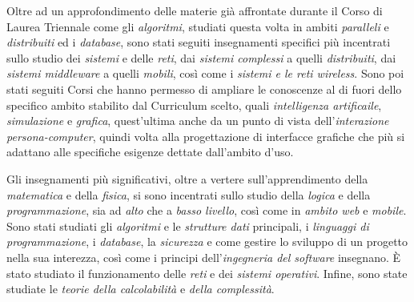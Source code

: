 {Oltre ad un approfondimento delle materie già affrontate durante il Corso di
Laurea Triennale come gli \textit{algoritmi}, studiati questa volta in ambiti
\textit{paralleli} e \textit{distribuiti} ed i \textit{database}, sono stati
seguiti insegnamenti specifici più incentrati sullo studio dei \textit{sistemi}
e delle \textit{reti}, dai \textit{sistemi complessi} a quelli
\textit{distribuiti}, dai \textit{sistemi middleware} a quelli \textit{mobili},
così come i \textit{sistemi e le reti wireless}. Sono poi stati seguiti Corsi
che hanno permesso di ampliare le conoscenze al di fuori dello specifico ambito
stabilito dal Curriculum scelto, quali \textit{intelligenza artificaile},
\textit{simulazione} e \textit{grafica}, quest'ultima anche da un punto di vista
dell'\textit{interazione persona-computer}, quindi volta alla progettazione di
interfacce grafiche che più si adattano alle specifiche esigenze dettate
dall'ambito d'uso.}

{Gli insegnamenti più significativi, oltre a vertere sull'apprendimento della
\textit{matematica} e della \textit{fisica}, si sono incentrati sullo studio
della \textit{logica} e della \textit{programmazione}, sia ad \textit{alto} che
a \textit{basso livello}, così come in \textit{ambito web} e \textit{mobile}.
Sono stati studiati gli \textit{algoritmi} e le \textit{strutture dati}
principali, i \textit{linguaggi di programmazione}, i \textit{database}, la
\textit{sicurezza} e come gestire lo sviluppo di un progetto nella sua
interezza, così come i principi dell'\textit{ingegneria del software} insegnano.
È stato studiato il funzionamento delle \textit{reti} e dei \textit{sistemi
operativi}. Infine, sono state studiate le \textit{teorie della calcolabilità} e
\textit{della complessità}.}
